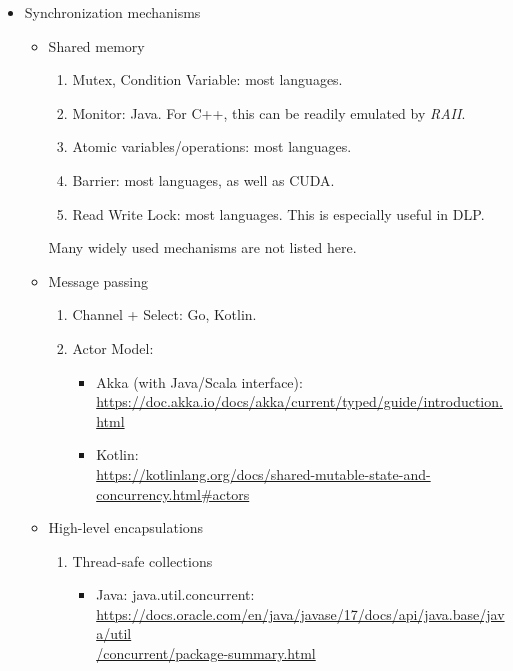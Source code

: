 \documentclass{article}
\begin{document}
\begin{itemize}
\begin{itemize}
        \item Synchronization mechanisms
        \begin{itemize}
            \item Shared memory
            \begin{enumerate}
                \item Mutex, Condition Variable: most languages.
                \item Monitor: Java.
                For C++, this can be readily emulated by \emph{RAII}.
                \item Atomic variables/operations: most languages.
                \item Barrier: most languages, as well as CUDA.
                \item Read Write Lock: most languages.
                This is especially useful in DLP.
            \end{enumerate}
            Many widely used mechanisms are not listed here.
            \item Message passing
            \begin{enumerate}
                \item Channel + Select: Go, Kotlin.
                \item Actor Model:
                    \begin{itemize}
                        \item Akka (with Java/Scala interface):\\ \href{https://doc.akka.io/docs/akka/current/typed/guide/introduction.html}{https://doc.akka.io/docs/akka/current/typed/guide/introduction.html}
                        \item Kotlin:\\
                        \href{https://kotlinlang.org/docs/shared-mutable-state-and-concurrency.html#actors}{https://kotlinlang.org/docs/shared-mutable-state-and-concurrency.html\#actors}
                    \end{itemize}
            \end{enumerate}
            \item High-level encapsulations
            \begin{enumerate}
                \item Thread-safe collections
                    \begin{itemize}
                    \item Java: java.util.concurrent:\\
                    \href{https://docs.oracle.com/en/java/javase/17/docs/api/java.base/java/util/concurrent/package-summary.html}{https://docs.oracle.com/en/java/javase/17/docs/api/java.base/java/util\\/concurrent/package-summary.html}
                    \end{itemize}
            \end{enumerate}
        \end{itemize}
    \end{itemize}
\end{itemize}
\end{document}
